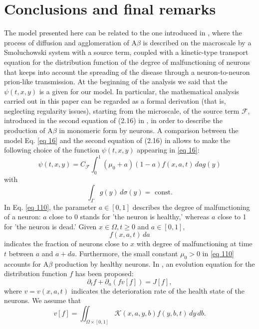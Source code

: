 \section{Conclusions and final remarks}
The model presented here can be related to the one introduced in \cite{Bertsch}, where the process of diffusion and agglomeration of $\mathrm{A} \beta$ is described on the macroscale by a Smoluchowski system with a source term, coupled with a kinetic-type transport equation for the distribution function of the degree of malfunctioning of neurons that keeps into account the spreading of the disease through a neuron-to-neuron prion-like transmission. At the beginning of the analysis we said that the $\psi(t,x,y)$ is a given for our model. In particular, the mathematical analysis carried out in this paper can be regarded as a formal derivation (that is, neglecting regularity issues), starting from the microscale, of the source term $\mathcal{F}$, introduced in the second equation of (2.16) in \cite{Bertsch}, in order to describe the production of $\mathrm{A} \beta$ in monomeric form by neurons. A comparison between the model Eq. \eqref{eq 16} and the second equation of (2.16) in \cite{Bertsch} allows to make the following choice of the function $\psi(t, x, y)$ appearing in \eqref{eq 16}:
\begin{equation}
  \psi(t, x, y)=C_{\mathcal{F}} \int_{0}^{1}\left(\mu_{0}+a\right)(1-a) f(x, a, t) \, {d} a g(y)
\label{eq 110}\end{equation}
with
$$
\int_{\Gamma} g(y) \, {d} \sigma(y)=\text { const.}
$$
In Eq. \eqref{eq 110}, the parameter $a \in[0,1]$ describes the degree of malfunctioning of a neuron: $a$ close to 0 stands for 'the neuron is healthy,' whereas $a$ close to 1 for 'the neuron is dead.' Given $x \in \Omega, t \geq 0$ and $a \in[0,1]$,
$$
f(x, a, t) \, {d} a
$$
indicates the fraction of neurons close to $x$ with degree of malfunctioning at time $t$ between $a$ and $a+d a$. Furthermore, the small constant $\mu_{0}>0$ in \eqref{eq 110} accounts for $\mathrm{A} \beta$ production by healthy neurons. In \cite{Bertsch}, an evolution equation for the distribution function $f$ has been proposed:
\begin{equation}
  \partial_{t} f+\partial_{a}(f v[f])=J[f],
\label{eq 111}\end{equation}
where $v=v(x, a, t)$ indicates the deterioration rate of the health state of the neurons. We assume that
\begin{equation}
  v[f]=\iint_{\Omega \times[0,1]} \mathcal{K}(x, a, y, b) f(y, b, t) \, {d} y \, {d} b .
\label{eq 112}\end{equation}
